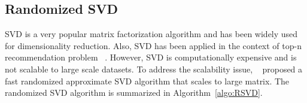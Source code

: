 




%

\subsection{Randomized SVD}
SVD is a very popular matrix factorization algorithm and has been widely used for dimensionality reduction. Also, SVD has been applied in the context of top-n recommendation problem ~\citep{Cremonesi:2010}. However, SVD is computationally expensive and is not scalable to large scale datasets. To address the scalability issue, ~\citep{halko2011} proposed a fast randomized approximate SVD algorithm that scales to large matrix. The randomized SVD algorithm is summarized in Algorithm~\ref{algo:RSVD}.

